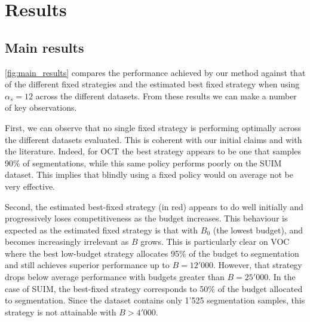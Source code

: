 \section{Results}
\label{sec:fullweak_results}

\subsection{Main results}
\cref{fig:main_results} compares the performance achieved by our method against that of the different fixed strategies and the estimated best fixed strategy when using $\alpha_s = 12$ across the different datasets. From these results we can make a number of key observations. 

First, we can observe that no single fixed strategy is performing optimally across the different datasets evaluated. This is coherent with our initial claims and with the literature. Indeed, for OCT the best strategy appears to be one that samples 90\% of segmentations, while this same policy performs poorly on the SUIM dataset. This implies that blindly using a fixed policy would on average not be very effective.

Second, the estimated best-fixed strategy (in red) appears to do well initially and progressively loses competitiveness as the budget increases. This behaviour is expected as the estimated fixed strategy is that with $B_0$ (the lowest budget), and becomes increasingly irrelevant as $B$ grows. This is particularly clear on VOC where the best low-budget strategy allocates 95\% of the budget to segmentation and still achieves superior performance up to $B=12'000$. However, that strategy drops below average performance with budgets greater than $B=25'000$. In the case of SUIM, the best-fixed strategy corresponds to 50\% of the budget allocated to segmentation. Since the dataset contains only 1'525 segmentation samples, this strategy is not attainable with $B > 4'000$.

